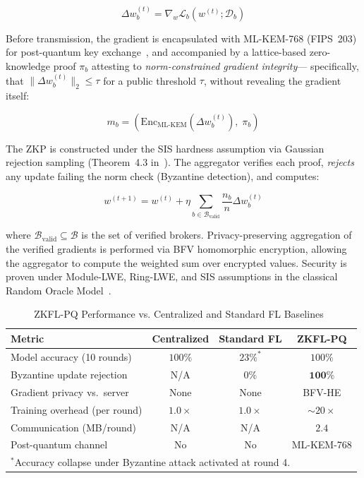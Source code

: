 \documentclass[12pt]{article}
\begin{document}
\begin{equation}
    \Delta w_b^{(t)} = \nabla_w \mathcal{L}_b(w^{(t)}; \mathcal{D}_b)
\end{equation}

Before transmission, the gradient is encapsulated with ML-KEM-768 (FIPS~203) for
post-quantum key exchange~\cite{lansiaux2026zkflpq}, and accompanied by a lattice-based
zero-knowledge proof $\pi_b$ attesting to \emph{norm-constrained gradient integrity}---
specifically, that $\|\Delta w_b^{(t)}\|_2 \leq \tau$ for a public threshold $\tau$,
without revealing the gradient itself:

\begin{equation}
    m_b = \left(\text{Enc}_{\text{ML-KEM}}(\Delta w_b^{(t)}),\; \pi_b\right)
\end{equation}

The ZKP is constructed under the SIS hardness assumption via Gaussian rejection sampling
(Theorem~4.3 in~\cite{lansiaux2026zkflpq}). The aggregator verifies each proof, \emph{rejects}
any update failing the norm check (Byzantine detection), and computes:

\begin{equation}
    w^{(t+1)} = w^{(t)} + \eta \sum_{b \in \mathcal{B}_{\text{valid}}} \frac{n_b}{n} \Delta w_b^{(t)}
\end{equation}

where $\mathcal{B}_{\text{valid}} \subseteq \mathcal{B}$ is the set of verified brokers.
Privacy-preserving aggregation of the verified gradients is performed via BFV homomorphic
encryption, allowing the aggregator to compute the weighted sum over encrypted values.
Security is proven under Module-LWE, Ring-LWE, and SIS assumptions in the classical
Random Oracle Model~\cite{lansiaux2026zkflpq}.

\begin{table}[h]
\centering
\caption{ZKFL-PQ Performance vs. Centralized and Standard FL Baselines~\cite{lansiaux2026zkflpq}}
\begin{tabular}{lccc}
\toprule
\textbf{Metric} & \textbf{Centralized} & \textbf{Standard FL} & \textbf{ZKFL-PQ} \\
\midrule
Model accuracy (10 rounds) & $100\%$ & $23\%^*$ & $100\%$ \\
Byzantine update rejection & N/A & $0\%$ & $\mathbf{100\%}$ \\
Gradient privacy vs.\ server & None & None & BFV-HE \\
Training overhead (per round) & $1.0\times$ & $1.0\times$ & ${\sim}20\times$ \\
Communication (MB/round) & N/A & N/A & $2.4$ \\
Post-quantum channel & No & No & ML-KEM-768 \\
\bottomrule
\multicolumn{4}{l}{$^*$Accuracy collapse under Byzantine attack activated at round 4.}
\end{tabular}
\end{table}
\end{document}
